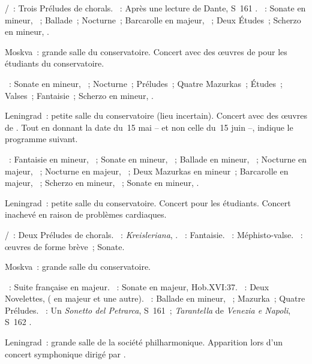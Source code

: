 \begin{description}
 \textsc{\JBach{}/\Busoni{}}~: Trois Préludes de chorals.
 \textsc{\Liszt{}}~: Après une lecture de Dante, S~161 .
 \textsc{\Chopin{}}~: Sonate  en \kB mineur, ~; Ballade~;
 Nocturne~; Barcarolle en \kF \Sharp majeur, ~; Deux Études~;
 Scherzo  en \kB mineur, .
 \item[\DateWithWeekDay{1930-06-08}]
 Moskva~: grande salle du conservatoire.
 Concert avec des œuvres de \Chopin{} pour les étudiants du conservatoire.

 \textsc{\Chopin{}}~: Sonate  en \kB \Flat mineur, ~;
 Nocturne~; Préludes~; Quatre Mazurkas~; Études~; Valses~; Fantaisie~;
 Scherzo  en \kB mineur, .
 \item[\DateWithWeekDay{1930-06-15}]
 Leningrad~: petite salle du conservatoire (lieu incertain).
 Concert avec des œuvres de \Chopin{}.
 Tout en donnant la date du~15 mai -- et non celle du~15 juin --,
 \citet[p.~152]{Nekrasova08} indique le programme \Chopin{} suivant.

 \textsc{\Chopin{}}~: Fantaisie en \kF mineur, ~; Sonate en \kB
 mineur, ~; Ballade en \kG mineur, ~; Nocturne en \kF
 \Sharp majeur,  ~; Nocturne en \kF majeur, 
 ~; Deux Mazurkas en \kC mineur~; Barcarolle en \kF \Sharp majeur,
 ~; Scherzo en \kB mineur, ~; Sonate en \kB \Flat mineur,
 .
 \item[\DateWithWeekDay{1930-07-05}]
 Leningrad~: petite salle du conservatoire.
 Concert pour les étudiants.
 Concert inachevé en raison de problèmes cardiaques.

 \textsc{\JBach{}/\Busoni{}}~: Deux Préludes de chorals.
 \textsc{\Schumann{}}~: \emph{Kreisleriana}, .
 \textsc{\Chopin{}}~: Fantaisie.
 \textsc{\Liszt{}}~: Méphisto-valse.
 \textsc{\Scriabine{}}~: œuvres de forme brève~; Sonate.
 \item[\DateWithWeekDay{1930-10-08}]
 Moskva~: grande salle du conservatoire.

 \textsc{\JBach{}}~: Suite française  en \kG majeur.
 \textsc{\Haydn{}}~: Sonate en \kD majeur, Hob.XVI:37.
 \textsc{\Schumann{}}~: Deux Novelettes,  ( en \kE majeur
 et une autre).
 \textsc{\Chopin{}}~: Ballade  en \kF mineur, ~;
 Mazurka~; Quatre Préludes.
 \textsc{\Liszt{}}~: Un \emph{Sonetto del Petrarca}, S~161~;
 \emph{Tarantella} de \emph{Venezia e Napoli}, S~162 .
 \item[\DateWithWeekDay{1930-10-11}]
 Leningrad~: grande salle de la société philharmonique.
 Apparition lors d'un concert symphonique dirigé par \AGauk{}.


\end{description}

